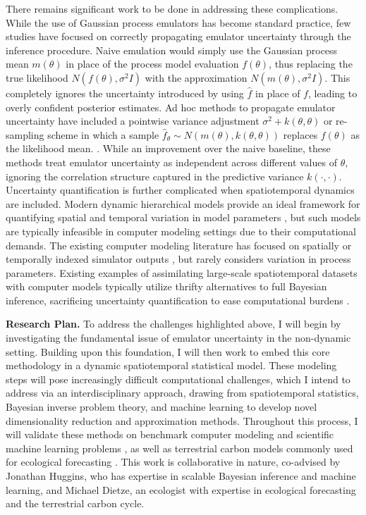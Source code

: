 \documentclass[12pt]{article}
\begin{document}
 There remains significant work to be done in addressing these complications. While the use of Gaussian process emulators has become standard practice, few studies have focused on correctly propagating emulator uncertainty through the inference procedure. Naive emulation would simply use the Gaussian process mean $m(\theta)$ in place of the process model evaluation $f(\theta)$, thus replacing the true likelihood $N(f(\theta), \sigma^2 I)$
with the approximation $N(m(\theta), \sigma^2 I)$. This completely ignores the uncertainty introduced by using $\hat{f}$ in place of $f$, leading to overly confident posterior estimates. Ad hoc methods to propagate emulator uncertainty have included a pointwise variance adjustment 
$\sigma^2 + k(\theta, \theta)$ or re-sampling scheme in which a sample $\hat{f}_{\theta} \sim N(m(\theta), k(\theta, \theta))$ replaces $f(\theta)$ as the likelihood mean. \cite{Fer, Cleary}. While an improvement over the naive baseline, these methods treat emulator uncertainty as independent across different values of $\theta$, ignoring the correlation structure captured in the predictive variance $k(\cdot, \cdot)$. Uncertainty quantification is further complicated when spatiotemporal dynamics are included. Modern dynamic hierarchical models provide an ideal framework for quantifying spatial and temporal variation in model parameters \cite{Wikle}, but such models are typically infeasible in computer modeling settings due to their computational demands. The existing computer modeling literature has focused on spatially or temporally indexed simulator outputs \cite{Fadikar}, but rarely considers variation in process parameters. Existing examples of assimilating large-scale spatiotemporal datasets with computer models typically utilize thrifty alternatives to full Bayesian inference, sacrificing uncertainty quantification to ease computational burdens \cite{Sun}.

\noindent
\textbf{Research Plan.} To address the challenges highlighted above, I will begin by investigating the fundamental issue of emulator uncertainty in the 
non-dynamic setting. Building upon this foundation, I will then work to embed this core methodology in a dynamic spatiotemporal statistical model. These modeling steps will pose increasingly difficult computational challenges, which I intend to address via an interdisciplinary approach, drawing from spatiotemporal statistics, Bayesian inverse problem theory, and machine learning to develop novel dimensionality reduction and approximation methods. Throughout this process, I will validate these methods on benchmark computer modeling and scientific machine learning problems \cite{Surjanovic, Takamoto}, as well as terrestrial carbon models commonly used for ecological forecasting \cite{Dietze}. This work is collaborative in nature, co-advised by Jonathan Huggins, who has expertise in scalable Bayesian inference and machine learning, and Michael Dietze, an ecologist with expertise in ecological forecasting and the terrestrial carbon cycle. 
 
\end{document}
